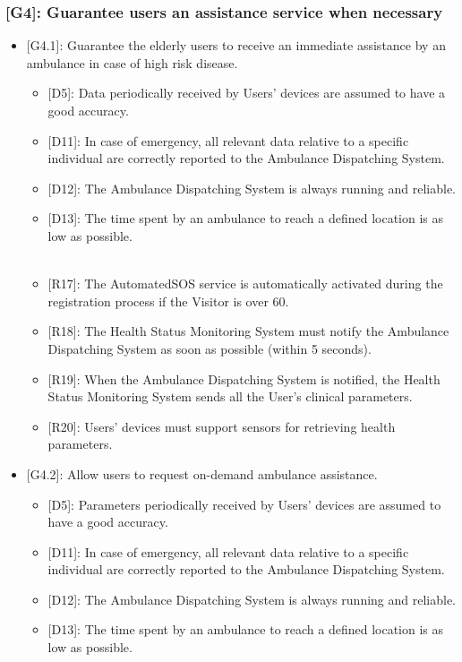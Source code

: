 \documentclass[12pt,a4paper]{article}
\begin{document}
	\subsubsection*{{[}{G4}{]}: Guarantee users an assistance service when necessary}
		\begin{itemize}
			\item {[G4.1]}: Guarantee the elderly users to receive an immediate assistance by an ambulance in case of high risk disease.
			\begin{itemize}
				\item {[D5]}: Data periodically received by Users' devices are assumed to have a good accuracy.
				\item {[D11]}: In case of emergency, all relevant data relative to a specific individual are correctly reported to the Ambulance Dispatching System.
				\item {[D12]}: The Ambulance Dispatching System is always running and reliable.
				\item {[D13]}: The time spent by an ambulance to reach a defined location is as low as possible.
				\\ \\
				\item {[R17]}: The AutomatedSOS service is automatically activated during the registration process if the Visitor is over 60.
				\item {[R18]}: The Health Status Monitoring System must notify the Ambulance Dispatching System as soon as possible (within 5 seconds).
				\item {[R19]}: When the Ambulance Dispatching System is notified, the Health Status Monitoring System sends all the User's clinical parameters.
				\item {[R20]}: Users' devices must support sensors for retrieving health parameters.
			\end{itemize}
			\item {[G4.2]}: Allow users to request on-demand ambulance assistance.
			\begin{itemize}
				\item {[D5]}: Parameters periodically received by Users' devices are assumed to have a good accuracy.
				\item {[D11]}: In case of emergency, all relevant data relative to a specific individual are correctly reported to the Ambulance Dispatching System.
				\item {[D12]}: The Ambulance Dispatching System is always running and reliable.
				\item {[D13]}: The time spent by an ambulance to reach a defined location is as low as possible.

\end{itemize}
\end{itemize}
\end{document}
